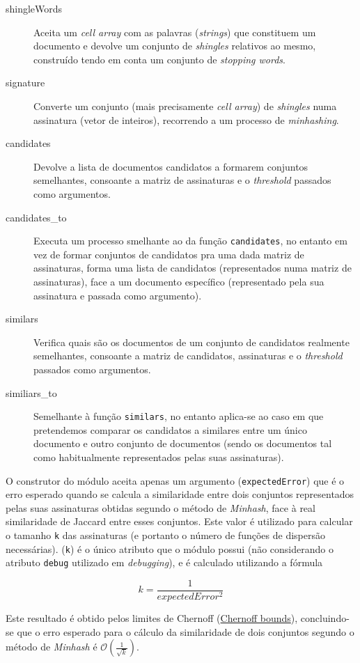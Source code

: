 \documentclass[a4paper,11pt,openright,oneside]{report}
\begin{document}
\begin{description}
\item[shingleWords]
Aceita um \textit{cell array} com as palavras (\textit{strings}) que constituem um documento e devolve um conjunto de \textit{shingles} relativos ao mesmo, construído tendo em conta um conjunto de \textit{stopping words}.
\item[signature]
Converte um conjunto (mais precisamente \textit{cell array}) de \textit{shingles} numa assinatura (vetor de inteiros), recorrendo a um processo de \textit{minhashing}.
\item[candidates]
Devolve a lista de documentos candidatos a formarem conjuntos semelhantes, consoante a matriz de assinaturas e o \textit{threshold} passados como argumentos.
\item[candidates\_to]
Executa um processo smelhante ao da função \texttt{candidates}, no entanto em vez de formar conjuntos de candidatos pra uma dada matriz de assinaturas, forma uma lista de candidatos (representados numa matriz de assinaturas), face a um documento específico (representado pela sua assinatura e passada como argumento).
\item[similars]
Verifica quais são os documentos de um conjunto de candidatos realmente semelhantes, consoante a matriz de candidatos, assinaturas e o \textit{threshold} passados como argumentos.
\item[similiars\_to]
Semelhante à função \texttt{similars}, no entanto aplica-se ao caso em que pretendemos comparar os candidatos a similares entre um único documento e outro conjunto de documentos (sendo os documentos tal como habitualmente representados pelas suas assinaturas).
\end{description}

O construtor do módulo aceita apenas um argumento (\texttt{expectedError}) que é o erro esperado quando se calcula a similaridade entre dois conjuntos representados pelas suas assinaturas obtidas segundo o método de \textit{Minhash}, face à real similaridade de Jaccard entre esses conjuntos. Este valor é utilizado para calcular o tamanho \texttt{k} das assinaturas (e portanto o número de funções de dispersão necessárias). (\texttt{k}) é o único atributo que o módulo possui (não considerando o atributo \texttt{debug} utilizado em \textit{debugging}), e é calculado utilizando a fórmula

$$ k = \frac{1}{expectedError^2} $$

Este resultado é obtido pelos limites de Chernoff (\href{https://en.wikipedia.org/wiki/Chernoff\_bound}{Chernoff bounds}), concluindo-se que o erro esperado para o cálculo da similaridade de dois conjuntos segundo o método de \textit{Minhash} é $\mathcal{O}\left(\frac{1}{\sqrt{k}}\right)$.
\end{document}
